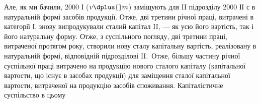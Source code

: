 Але, як ми бачили, 2000 І ($v \dplus{} m$) заміщують для II підрозділу 2000
ІІ $с$ в натуральній формі засобів продукції. Отже, дві третини річної
праці, витрачені в категорії І, знову випродукували сталий капітал II, —
як усю його вартість, так і його натуральну форму. Отже, з суспільного
погляду, дві третини праці, витраченої протягом року, створили нову сталу
капітальну вартість, реалізовану в натуральній формі, відповідній підрозділові
II.~Отже, більшу частину річної суспільної праці витрачено на
продукцію нового сталого капіталу (капітальної вартости, що існує в
засобах продукції) для заміщення сталої капітальної вартости, витраченої
на продукцію засобів споживання. Капіталістичне суспільство в цьому
\parbreak{}  %
